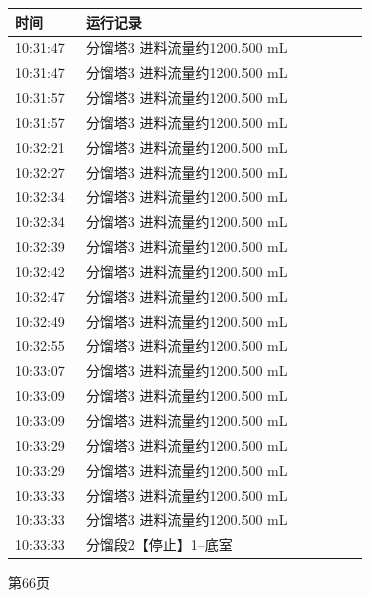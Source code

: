 \documentclass[UTF8,10pt,a4paper,fontset=fandol]{ctexart}
\begin{document}
\begin{center}
\begin{minipage}[t]{0.47\linewidth}
\smallskip
\begin{tabular}{|p{0.18\linewidth}|p{0.72\linewidth}|}
\hline
时间 & 运行记录 \\ \hline
10:31:47 & 分馏塔3 进料流量约1200.500 mL \\ \hline
10:31:47 & 分馏塔3 进料流量约1200.500 mL \\ \hline
10:31:57 & 分馏塔3 进料流量约1200.500 mL \\ \hline
10:31:57 & 分馏塔3 进料流量约1200.500 mL \\ \hline
10:32:21 & 分馏塔3 进料流量约1200.500 mL \\ \hline
10:32:27 & 分馏塔3 进料流量约1200.500 mL \\ \hline
10:32:34 & 分馏塔3 进料流量约1200.500 mL \\ \hline
10:32:34 & 分馏塔3 进料流量约1200.500 mL \\ \hline
10:32:39 & 分馏塔3 进料流量约1200.500 mL \\ \hline
10:32:42 & 分馏塔3 进料流量约1200.500 mL \\ \hline
10:32:47 & 分馏塔3 进料流量约1200.500 mL \\ \hline
10:32:49 & 分馏塔3 进料流量约1200.500 mL \\ \hline
10:32:55 & 分馏塔3 进料流量约1200.500 mL \\ \hline
10:33:07 & 分馏塔3 进料流量约1200.500 mL \\ \hline
10:33:09 & 分馏塔3 进料流量约1200.500 mL \\ \hline
10:33:09 & 分馏塔3 进料流量约1200.500 mL \\ \hline
10:33:29 & 分馏塔3 进料流量约1200.500 mL \\ \hline
10:33:29 & 分馏塔3 进料流量约1200.500 mL \\ \hline
10:33:33 & 分馏塔3 进料流量约1200.500 mL \\ \hline
10:33:33 & 分馏塔3 进料流量约1200.500 mL \\ \hline
10:33:33 & 分馏段2【停止】1--底室 \\ \hline
\end{tabular}

\smallskip
第66页
\end{minipage}
\end{center}

\vfill
\end{document}
